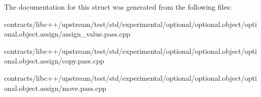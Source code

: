 The documentation for this struct was generated from the following files\+:\begin{DoxyCompactItemize}
\item 
contracts/libc++/upstream/test/std/experimental/optional/optional.\+object/optional.\+object.\+assign/assign\+\_\+value.\+pass.\+cpp\item 
contracts/libc++/upstream/test/std/experimental/optional/optional.\+object/optional.\+object.\+assign/copy.\+pass.\+cpp\item 
contracts/libc++/upstream/test/std/experimental/optional/optional.\+object/optional.\+object.\+assign/move.\+pass.\+cpp\end{DoxyCompactItemize}
